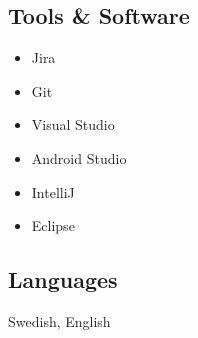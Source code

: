 \documentclass{article}
\begin{document}
\begin{minipage}[t]{0.28\textwidth}
		\subsection*{\textcolor{colorBlue}{Tools \& Software}}
		\begin{itemize}
			\item Jira
			\item Git
			\item Visual Studio
			\item Android Studio
			\item IntelliJ
			\item Eclipse
		\end{itemize}
		\vspace{-10pt} %
		\subsection*{\textcolor{colorBlue}{Languages}}
		Swedish, English
	\end{minipage}
	
\end{document}
